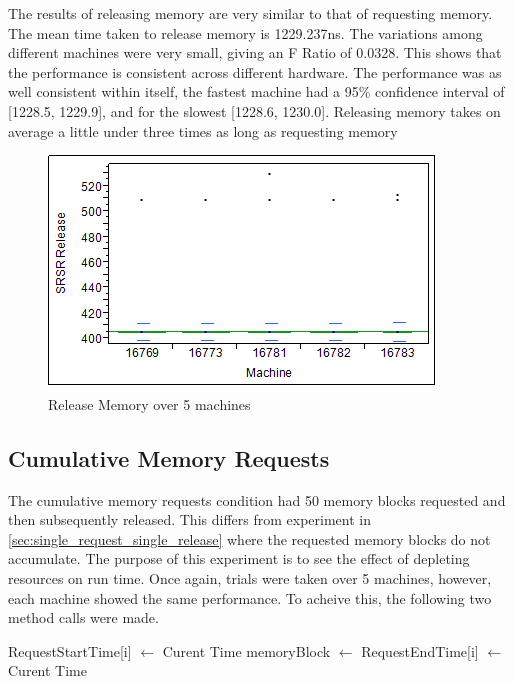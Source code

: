\documentclass[12pt]{report}
\begin{document}
The results of releasing memory are very similar to that of requesting memory. The mean time taken to release memory is 1229.237ns. The variations among different machines were very small, giving an F Ratio of 0.0328. This shows that the performance is consistent across different hardware. The performance was as well consistent within itself, the fastest machine had a 95\% confidence interval of [1228.5, 1229.9], and for the slowest [1228.6, 1230.0]. Releasing memory takes on average a little under three times as long as requesting memory

\begin{figure}[h!]
  \centering
    \includegraphics{SRSRReleaseMemory.png}
  \caption{Release Memory over 5 machines}
\end{figure}

\subsection{Cumulative Memory Requests}
\label{sec:cumulative_memory_requests}

\par The cumulative memory requests condition had 50 memory blocks requested and then subsequently released. This differs from experiment in \ref{sec:single_request_single_release} where the requested memory blocks do not accumulate. The purpose of this experiment is to see the effect of depleting resources on run time. Once again, trials were taken over 5 machines, however, each machine showed the same performance. To acheive this, the following two method calls were made.

\begin{algorithmic}
      \State RequestStartTime[i] $\gets$ Curent Time
      \State memoryBlock $\gets$  
      \State RequestEndTime[i] $\gets$ Curent Time
    \EndFor
  \EndFunction
\end{algorithmic}
\end{document}
